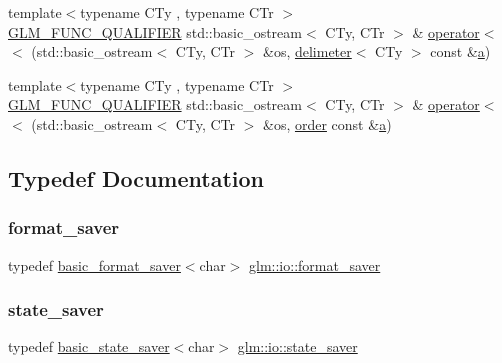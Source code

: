 \begin{DoxyCompactItemize}
{\footnotesize template$<$typename C\+Ty , typename C\+Tr $>$ }\\\mbox{\hyperlink{setup_8hpp_a33fdea6f91c5f834105f7415e2a64407}{G\+L\+M\+\_\+\+F\+U\+N\+C\+\_\+\+Q\+U\+A\+L\+I\+F\+I\+ER}} std\+::basic\+\_\+ostream$<$ C\+Ty, C\+Tr $>$ \& \mbox{\hyperlink{namespaceglm_1_1io_a7c5774d5b7b03ff810042e141d893082}{operator$<$$<$}} (std\+::basic\+\_\+ostream$<$ C\+Ty, C\+Tr $>$ \&os, \mbox{\hyperlink{structglm_1_1io_1_1delimeter}{delimeter}}$<$ C\+Ty $>$ const \&\mbox{\hyperlink{_s_d_l__opengl__glext_8h_a3309789fc188587d666cda5ece79cf82}{a}})
\item 
{\footnotesize template$<$typename C\+Ty , typename C\+Tr $>$ }\\\mbox{\hyperlink{setup_8hpp_a33fdea6f91c5f834105f7415e2a64407}{G\+L\+M\+\_\+\+F\+U\+N\+C\+\_\+\+Q\+U\+A\+L\+I\+F\+I\+ER}} std\+::basic\+\_\+ostream$<$ C\+Ty, C\+Tr $>$ \& \mbox{\hyperlink{namespaceglm_1_1io_a4dab7c825ecbd918643ed9fc9ef4ecb6}{operator$<$$<$}} (std\+::basic\+\_\+ostream$<$ C\+Ty, C\+Tr $>$ \&os, \mbox{\hyperlink{structglm_1_1io_1_1order}{order}} const \&\mbox{\hyperlink{_s_d_l__opengl__glext_8h_a3309789fc188587d666cda5ece79cf82}{a}})
\end{DoxyCompactItemize}


\subsection{Typedef Documentation}
\mbox{\label{namespaceglm_1_1io_afdc168a994ef9e9ca4295578e9097495}} 
\subsubsection{\texorpdfstring{format\+\_\+saver}{format\_saver}}
{\footnotesize\ttfamily typedef \mbox{\hyperlink{classglm_1_1io_1_1basic__format__saver}{basic\+\_\+format\+\_\+saver}}$<$char$>$ \mbox{\hyperlink{namespaceglm_1_1io_afdc168a994ef9e9ca4295578e9097495}{glm\+::io\+::format\+\_\+saver}}}

\mbox{\label{namespaceglm_1_1io_a84d63ac771c3125d38f144dc15234764}} 
\subsubsection{\texorpdfstring{state\+\_\+saver}{state\_saver}}
{\footnotesize\ttfamily typedef \mbox{\hyperlink{classglm_1_1io_1_1basic__state__saver}{basic\+\_\+state\+\_\+saver}}$<$char$>$ \mbox{\hyperlink{namespaceglm_1_1io_a84d63ac771c3125d38f144dc15234764}{glm\+::io\+::state\+\_\+saver}}}

